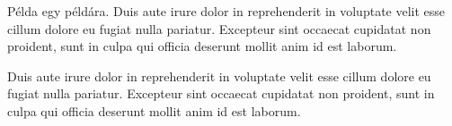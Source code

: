 \begin{example}
Példa egy példára. Duis aute irure dolor in reprehenderit in voluptate velit esse cillum dolore eu fugiat nulla pariatur. Excepteur sint occaecat cupidatat non proident, sunt in culpa qui officia deserunt mollit anim id est laborum.
\end{example}

\begin{theorem}
Duis aute irure dolor in reprehenderit in voluptate velit esse cillum dolore eu fugiat nulla pariatur. Excepteur sint occaecat cupidatat non proident, sunt in culpa qui officia deserunt mollit anim id est laborum.
\end{theorem}
